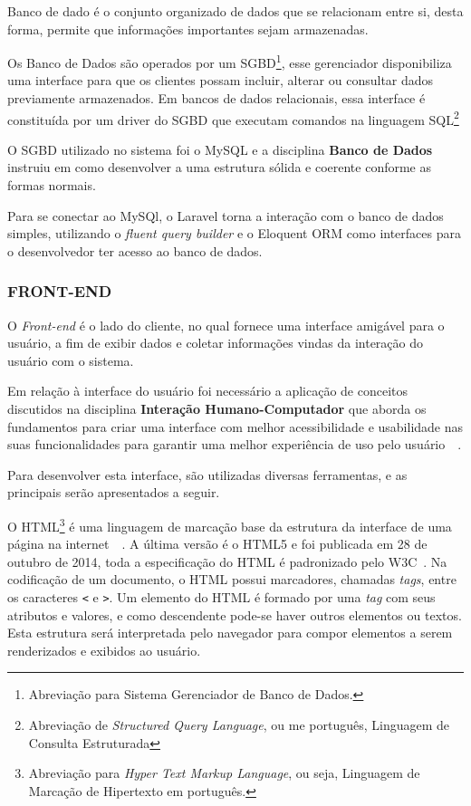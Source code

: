 \documentclass[
  12pt,            %
  openany,
  oneside,
  a4paper,         %
  english,      %
  brazil
]{article}
\numberwithin{figure}{section}
\numberwithin{table}{section}
\newcounter{subsubsubsection}[subsubsection]
\begin{document}

Banco de dado é o conjunto organizado de dados que se relacionam entre si, desta forma, permite que informações importantes sejam armazenadas.

Os Banco de Dados são operados por um SGBD\footnote{Abreviação para Sistema Gerenciador de Banco de Dados.}, esse gerenciador disponibiliza uma interface para que os clientes possam incluir, alterar ou consultar dados previamente armazenados. Em bancos de dados relacionais, essa interface é constituída por um driver do SGBD que executam comandos na linguagem SQL\footnote{Abreviação de \textit{Structured Query Language}, ou me português, Linguagem de Consulta Estruturada}

O SGBD utilizado no sistema foi o MySQL e a disciplina \textbf{Banco de Dados} instruiu em como desenvolver a uma estrutura sólida e coerente conforme as formas normais.

Para se conectar ao MySQl, o Laravel torna a interação com o banco de dados simples, utilizando o \textit{fluent query builder} e o Eloquent ORM como interfaces para o desenvolvedor ter acesso ao banco de dados.





\subsubsection{FRONT-END}
O \textit{Front-end} é o lado do cliente, no qual fornece uma interface amigável para o usuário, a fim de exibir dados e coletar informações vindas da interação do usuário com o sistema.

Em relação à interface do usuário foi necessário a aplicação de conceitos discutidos na disciplina \textbf{Interação Humano-Computador} que aborda os fundamentos para criar uma interface com melhor acessibilidade e usabilidade nas suas funcionalidades para garantir uma melhor experiência de uso pelo usuário~\cite{IHC_benyon}~\cite{IHC_preece}.

Para desenvolver esta interface, são utilizadas diversas ferramentas, e as principais serão apresentados a seguir.


O HTML\footnote{Abreviação para \textit{Hyper Text Markup Language}, ou seja, Linguagem de Marcação de Hipertexto em português.} é uma linguagem de marcação base da estrutura da interface de uma página na internet~\cite{Novatec_css_html}~\cite{PHP_Novatec_dev}. A última versão é o HTML5 e foi publicada em 28 de outubro de 2014, toda a especificação do HTML é padronizado pelo W3C~\cite{w3c}.
Na codificação de um documento, o HTML possui marcadores, chamadas \textit{tags}, entre os caracteres \texttt{<} e \texttt{>}. Um elemento do HTML é formado por uma \textit{tag} com seus atributos e valores, e como descendente pode-se haver outros elementos ou textos. Esta estrutura será interpretada pelo navegador para compor elementos a serem renderizados e exibidos ao usuário.
\end{document}
